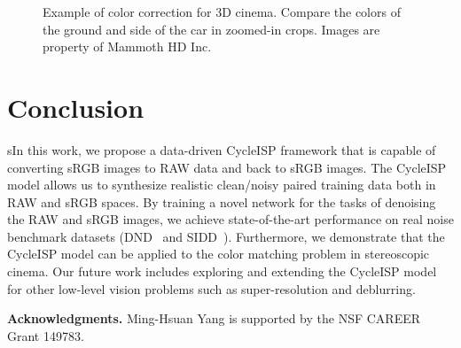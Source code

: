 \documentclass[10pt,twocolumn,letterpaper]{article}
\begin{document}
\begin{figure}[t]
\begin{center}
\end{center}
\vspace*{-1.4em}
\caption{Example of color correction for 3D cinema. Compare the colors of the ground and side of the car in zoomed-in crops. Images are property of Mammoth HD Inc. }
\label{Fig:3d results}
\vspace*{-3mm}
\end{figure}


\section{Conclusion}
sIn this work, we propose a data-driven CycleISP framework that is capable of converting sRGB images to RAW data and back to sRGB images.
The CycleISP model allows us to synthesize realistic clean/noisy paired training data both in RAW and sRGB spaces. By training a novel network for the tasks of denoising the RAW and sRGB images, we achieve state-of-the-art performance on real noise benchmark datasets (DND~\cite{dnd} and SIDD~\cite{sidd}). 
Furthermore, we demonstrate that the CycleISP model can be applied to the color matching problem in stereoscopic cinema. 
Our future work includes exploring and extending the CycleISP model for other low-level vision problems such as super-resolution and deblurring.

\vspace{0.5em}\noindent\textbf{Acknowledgments.} Ming-Hsuan Yang is supported by the NSF CAREER Grant 149783.


{\small


}
\end{document}
